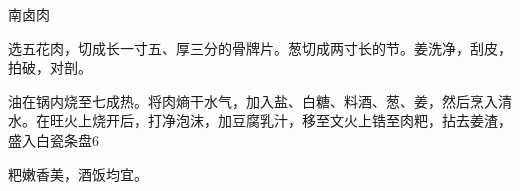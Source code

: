 \begin{recipe}{南卤肉}

\ingredients




\cooking

\step 选五花肉，切成长一寸五、厚三分的骨牌片。葱切成两寸长的节。姜洗净，刮皮，拍破，对剖。

\step 油在锅内烧至七成热。将肉熵干水气，加入盐、白糖、料酒、葱、姜，然后烹入清水。在旺火上烧开后，打净泡沫，加豆腐乳汁，移至文火上锆至肉粑，拈去姜渣，盛入白瓷条盘6

\notes

粑嫩香美，酒饭均宜。

\end{recipe}

